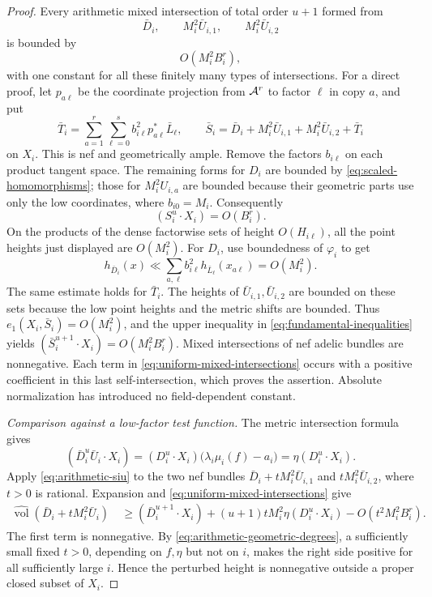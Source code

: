 \begin{proof}
Every arithmetic mixed intersection of total order \(u+1\) formed from
\[
 \bar D_i,\qquad M_i^2\bar U_{i,1},\qquad M_i^2\bar U_{i,2}
\]
is bounded by
\begin{equation}\label{eq:uniform-mixed-intersections}
 O(M_i^2B_i^r),
\end{equation}
with one constant for all these finitely many types of intersections.
For a direct proof, let \(p_{a\ell}\) be the coordinate projection from
\(\mathcal A^r\) to factor \(\ell\) in copy \(a\), and put
\[
 \bar T_i=\sum_{a=1}^r\sum_{\ell=0}^s
 b_{i\ell}^2p_{a\ell}^*\bar L_\ell,
 \qquad
 \bar S_i=\bar D_i+M_i^2\bar U_{i,1}
                 +M_i^2\bar U_{i,2}+\bar T_i
\]
on \(X_i\).  This is nef and geometrically ample.  Remove the factors
\(b_{i\ell}\) on each product tangent space.  The remaining forms
for \(D_i\) are bounded by \eqref{eq:scaled-homomorphisms}; those for
\(M_i^2U_{i,a}\) are bounded because their geometric parts use only
the low coordinates, where \(b_{i0}=M_i\).  Consequently
\[
 (S_i^u\cdot X_i)=O(B_i^r).
\]
On the products of the dense factorwise sets of height
\(O(H_{i\ell})\), all the point heights just displayed are
\(O(M_i^2)\).  For \(D_i\), use boundedness of \(\varphi_i\) to get
\[
 h_{\bar D_i}(x)\ll
 \sum_{a,\ell} b_{i\ell}^2
                 h_{\bar L_\ell}(x_{a\ell})=O(M_i^2).
\]
The same estimate holds for \(\bar T_i\).  The heights of
\(\bar U_{i,1},\bar U_{i,2}\) are bounded on these sets because the
low point heights and the metric shifts are bounded.  Thus
\(e_1(X_i,\bar S_i)=O(M_i^2)\), and the upper inequality in
\eqref{eq:fundamental-inequalities} yields
\((\bar S_i^{u+1}\cdot X_i)=O(M_i^2B_i^r)\).
Mixed intersections of nef adelic bundles are nonnegative.  Each term
in \eqref{eq:uniform-mixed-intersections} occurs with a positive
coefficient in this last self-intersection, which proves the assertion.
Absolute normalization has introduced no field-dependent constant.

\emph{Comparison against a low-factor test function.}
The metric intersection formula gives
\[
 (\bar D_i^u\bar U_i\cdot X_i)
 =(D_i^u\cdot X_i)\big(\lambda_i\mu_i(f)-a_i\big)
 =\eta(D_i^u\cdot X_i).
\]
Apply \eqref{eq:arithmetic-siu} to the two nef bundles
\(\bar D_i+tM_i^2\bar U_{i,1}\) and
\(tM_i^2\bar U_{i,2}\), where \(t>0\) is rational.  Expansion and
\eqref{eq:uniform-mixed-intersections} give
\begin{align*}
 \widehat{\operatorname{vol}}(\bar D_i+tM_i^2\bar U_i)
 \ &\ge (\bar D_i^{u+1}\cdot X_i)
 +(u+1)tM_i^2\eta(D_i^u\cdot X_i)
 -O(t^2M_i^2B_i^r).
\end{align*}
The first term is nonnegative.  By
\eqref{eq:arithmetic-geometric-degrees}, a sufficiently small fixed
\(t>0\), depending on \(f,\eta\) but not on \(i\), makes the right
side positive for all sufficiently large \(i\).  Hence the perturbed
height is nonnegative outside a proper closed subset of \(X_i\).


\end{proof}
